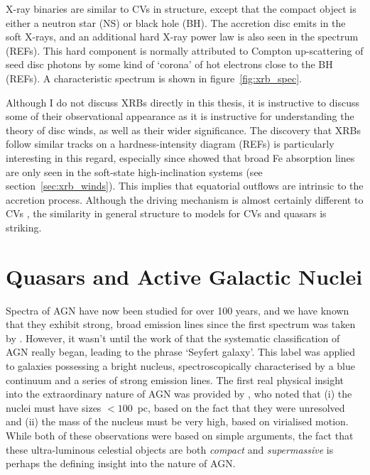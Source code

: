 X-ray binaries are similar to CVs in structure, except that the compact object
is either a neutron star (NS) or black hole (BH). The accretion disc 
emits in the soft X-rays, and an additional hard X-ray power law is also 
seen in the spectrum (REFs). This hard component is normally attributed
to Compton up-scattering of seed disc photons by some kind of `corona'
of hot electrons close to the BH (REFs). A characteristic spectrum is shown 
in figure~\ref{fig:xrb_spec}.

Although I do not discuss XRBs directly in this thesis, it is instructive
to discuss some of their observational appearance as it is instructive 
for understanding the theory of disc winds, as well as their wider significance. 
The discovery that XRBs follow similar tracks on a hardness-intensity diagram (REFs)
is particularly interesting in this regard, especially since \cite{ponti2012}
showed that broad Fe absorption lines are only seen in the soft-state 
high-inclination systems (see section~\ref{sec:xrb_winds}). 
This implies that equatorial outflows are intrinsic to 
the accretion process. Although the driving mechanism
is almost certainly different to CVs \citep{diaztrigo2015}, 
the similarity in general structure 
to models for CVs and quasars is striking.




\section{Quasars and Active Galactic Nuclei}

Spectra of AGN have now been studied for over 100 years, and we have known 
that they exhibit strong, broad emission lines since the first spectrum was taken by
\cite{fath1909}.
However, it wasn't until the work of \cite{seyfert1943} that the systematic 
classification of AGN really began, leading to the phrase `Seyfert galaxy'.
This label was applied to galaxies possessing a bright nucleus, spectroscopically
characterised by a blue continuum and a series of strong emission lines.
The first real physical insight into the extraordinary nature of AGN
was provided by \cite{woltjer1959}, who noted that (i) the nuclei must have sizes $<100$~pc,
based on the fact that they were unresolved and (ii) the mass of the nucleus
must be very high, based on virialised motion. 
While both of these observations were based on simple arguments, the fact that these
ultra-luminous celestial objects are both {\em compact} and {\em supermassive}
is perhaps the defining insight into the nature of AGN.

